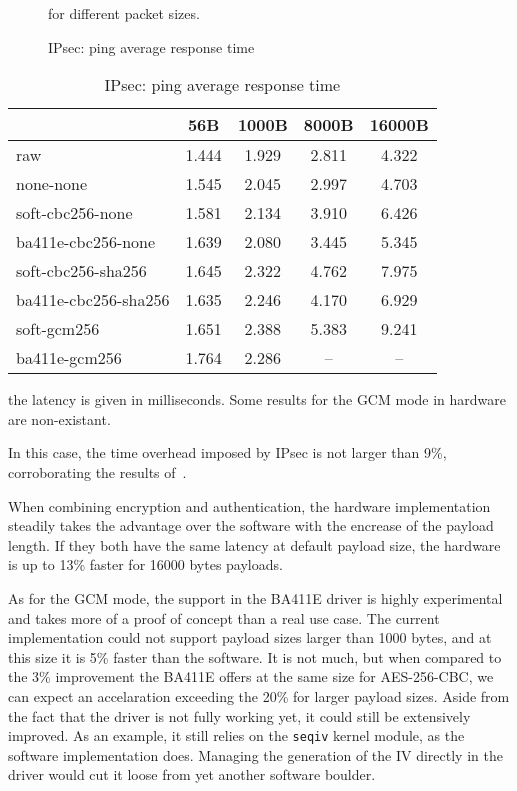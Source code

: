 \begin{figure}[ht]

\caption{IPsec: ping average response time}{for different packet sizes.}
\label{fig:ping-benchmark-ipsec}
\end{figure}

\begin{table}[ht]
\center
\small
\begin{tabular}{l|c|c|c|c|} \cline{2-5}
 & 56B & 1000B & 8000B & 16000B \\ \hline
\multicolumn{1}{|l|}{raw} & 1.444 & 1.929 & 2.811 & 4.322 \\ \hline
\multicolumn{1}{|l|}{none-none} & 1.545 & 2.045 & 2.997 & 4.703 \\ \hline
\multicolumn{1}{|l|}{soft-cbc256-none} & 1.581 & 2.134 & 3.910 & 6.426 \\ \hline
\multicolumn{1}{|l|}{ba411e-cbc256-none} & 1.639 & 2.080 & 3.445 & 5.345 \\ \hline
\multicolumn{1}{|l|}{soft-cbc256-sha256} & 1.645 & 2.322 & 4.762 & 7.975 \\ \hline
\multicolumn{1}{|l|}{ba411e-cbc256-sha256} & 1.635 & 2.246 & 4.170 & 6.929 \\ \hline
\multicolumn{1}{|l|}{soft-gcm256} & 1.651 & 2.388 & 5.383 & 9.241 \\ \hline
\multicolumn{1}{|l|}{ba411e-gcm256} & 1.764 & 2.286 & -- & --  \\ \hline
\end{tabular}
\caption{IPsec: ping average response time}{the latency is given in milliseconds. Some results for the GCM mode in hardware are non-existant.}
\label{tab:ping-benchmark-ipsec}
\end{table}

In this case, the time overhead imposed by IPsec is not larger than 9\%, corroborating the results of~\citet{Xenakis20063225}.

When combining encryption and authentication, the hardware implementation steadily takes the advantage over the software with the encrease of the payload length.
If they both have the same latency at default payload size, the hardware is up to 13\% faster for 16000 bytes payloads.

As for the GCM mode, the support in the BA411E driver is highly experimental and takes more of a proof of concept than a real use case.
The current implementation could not support payload sizes larger than 1000 bytes, and at this size it is 5\% faster than the software.
It is not much, but when compared to the 3\% improvement the BA411E offers at the same size for AES-256-CBC, we can expect an accelaration exceeding the 20\% for larger payload sizes. %
Aside from the fact that the driver is not fully working yet, it could still be extensively improved.
As an example, it still relies on the \texttt{seqiv} kernel module, as the software implementation does.
Managing the generation of the IV directly in the driver would cut it loose from yet another software boulder.



